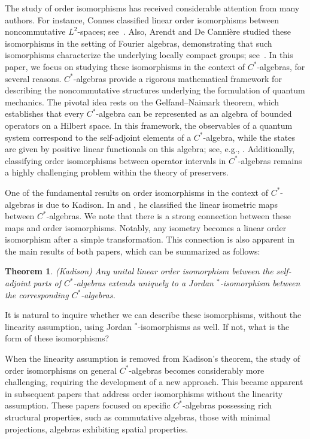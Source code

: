 \documentclass[12pt]{amsart}
\newtheorem{thm}{Theorem}[section]
\theoremstyle{definition}
\theoremstyle{remark}
\numberwithin{equation}{section}
\begin{document}
The study of order isomorphisms has received considerable attention from many authors. 
For instance, Connes classified linear order isomorphisms between noncommutative $L^2$-spaces; see~\cite{Connes}. 
Also, Arendt and De Cannière studied these isomorphisms in the  setting of Fourier algebras, demonstrating that such isomorphisms characterize the underlying locally compact groups; see~\cite{ Arendt}. In this paper, we focus on studying these isomorphisms in the context of $C^*$-algebras, for several reasons. 
 $C^*$-algebras provide a rigorous mathematical framework for describing the noncommutative structures underlying the formulation of quantum mechanics. 
The pivotal idea rests on the Gelfand--Naimark theorem, which establishes that every $C^*$-algebra can be represented as an algebra of bounded operators on a Hilbert space. 
In this framework, the observables of a quantum system correspond to the self-adjoint elements of a $C^*$-algebra, while the states are given by positive linear functionals on this algebra; see, e.g., \cite{B3}. Additionally, classifying order isomorphisms between operator intervals in $C^*$-algebras remains a highly challenging problem within the theory of preservers.



One of the fundamental results on order isomorphisms in the context of $C^*$-algebras is due to Kadison. In \cite{Kadison1} and  \cite{Kadison2}, he classified the linear isometric maps between $C^*$-algebras.
 We note that there is a strong connection between these maps and order isomorphisms.  Notably, any isometry becomes a linear order isomorphism after a simple transformation.  This connection is also apparent in the main results of both papers, which can be summarized as follows: 
\begin{thm}(Kadison)	
Any  unital linear order isomorphism between the self-adjoint parts of $C^*$-algebras extends uniquely to a Jordan $^*$-isomorphism between the corresponding $C^*$-algebras.
\end{thm}
 It is natural to inquire whether we can describe these  isomorphisms, without the linearity assumption, using Jordan $^*$-isomorphisms as well. If not, what is the form of these isomorphisms?

 When the linearity assumption is removed from Kadison’s theorem, the study of order isomorphisms on general $C^*$-algebras becomes considerably more challenging, requiring the development of a new approach.
 This became apparent in subsequent papers  that address order isomorphisms without the linearity assumption. These papers focused on specific $C^*$-algebras possessing rich structural properties, such as commutative algebras, those with minimal projections, algebras exhibiting spatial properties.  
 
\end{document}
